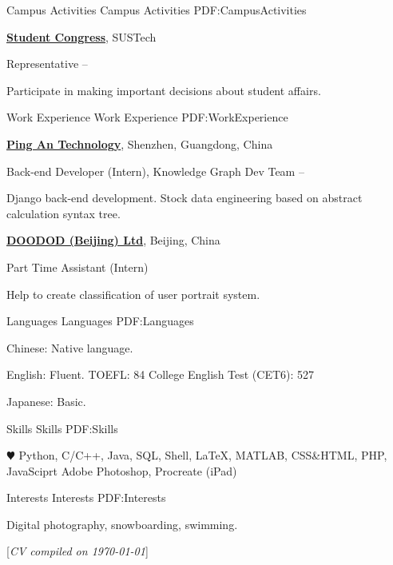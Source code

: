 \documentclass[a4paper,MMMyyyy,nonstopmode]{simpleresumecv}
\newcommand{\CVNote}{CV compiled on {\today}}
\begin{document}
\begin{Body}


\Section
{Campus Activities}
{Campus Activities}
{PDF:CampusActivities}

\Entry
\href{https://www.sustech.edu.cn/en/campus-life.html?lang=en}
{\textbf{Student Congress}},
SUSTech

\Gap
\BulletItem
Representative
\hfill
{} --
\begin{Detail}
\SubBulletItem
Participate in making important decisions about student affairs.
\end{Detail}


\Section
{Work\newline
Experience}
{Work Experience}
{PDF:WorkExperience}

\Entry
\href{https://tech.pingan.com/}
{\textbf{Ping An Technology}},
Shenzhen, Guangdong, China

\Gap
\BulletItem
Back-end Developer (Intern),
Knowledge Graph Dev Team
\hfill
{} --
\begin{Detail}
\SubBulletItem
Django back-end development.
\SubBulletItem
Stock data engineering based on abstract calculation syntax tree.
\end{Detail}

\Entry
\href{https://www.doodod.com/}
{\textbf{DOODOD (Beijing) Ltd}},
Beijing, China

\Gap
\BulletItem
Part Time Assistant (Intern)
\hfill
{}
\begin{Detail}
\SubBulletItem
Help to create classification of user portrait system.
\end{Detail}


\Section
{Languages}
{Languages}
{PDF:Languages}

\BulletItem
Chinese: Native language.

\Gap
\BulletItem
English: Fluent.
\SubBulletItem
[\DatestampYMD{2020}{12}{06}]
TOEFL: 84
\SubBulletItem
[\DatestampYMD{2019}{06}{01}]
College English Test  (CET6): 527

\Gap
\BulletItem
Japanese: Basic.


\Section
{Skills}
{Skills}
{PDF:Skills}

\Entry
\BulletItem
{\color{black} $\varheart$} Python,
C/C++,
Java,
SQL,
Shell,
{\LaTeX},
MATLAB,
CSS\&HTML,
PHP,
JavaSciprt
\BulletItem
Adobe Photoshop,
Procreate (iPad)


\Section
{Interests}
{Interests}
{PDF:Interests}

\Entry
Digital photography,
snowboarding,
swimming.



\end{Body}


\BigGap
\UseNoteFont%
\null\hfill%
[\textit{\CVNote}]
\end{document}
